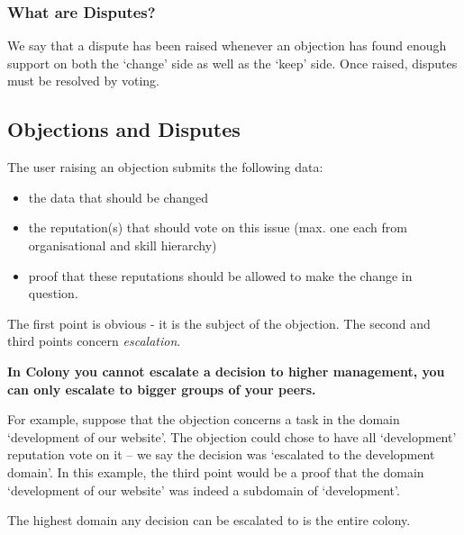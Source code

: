 \subsubsection*{What are Disputes?}
We say that a dispute has been raised whenever an objection has found enough support on both the `change' side as well as the `keep' side. Once raised, disputes must be resolved by voting. 

\subsection{Objections and Disputes}\label{sec:objections-and-disputes}

The user raising an objection submits the following data:
\begin{itemize}
 \item the data that should be changed
 \item the reputation(s) that should vote on this issue (max. one each from organisational and skill hierarchy)
 \item proof that these reputations should be allowed to make the change in question. 
\end{itemize}

The first point is obvious - it is the subject of the objection. The second and third points concern \emph{escalation}. 

\begin{center}
 \textbf{In Colony you cannot escalate a decision to higher management, you can only escalate to bigger groups of your peers.}
\end{center}

For example, suppose that the objection concerns a task in the domain `development of our website'. The objection could chose to have all `development' reputation vote on it -- we say the decision was `escalated to the development domain'. In this example, the third point would be a proof that the domain `development of our website' was indeed a subdomain of `development'.

The highest domain any decision can be escalated to is the entire colony.













% 
% 


